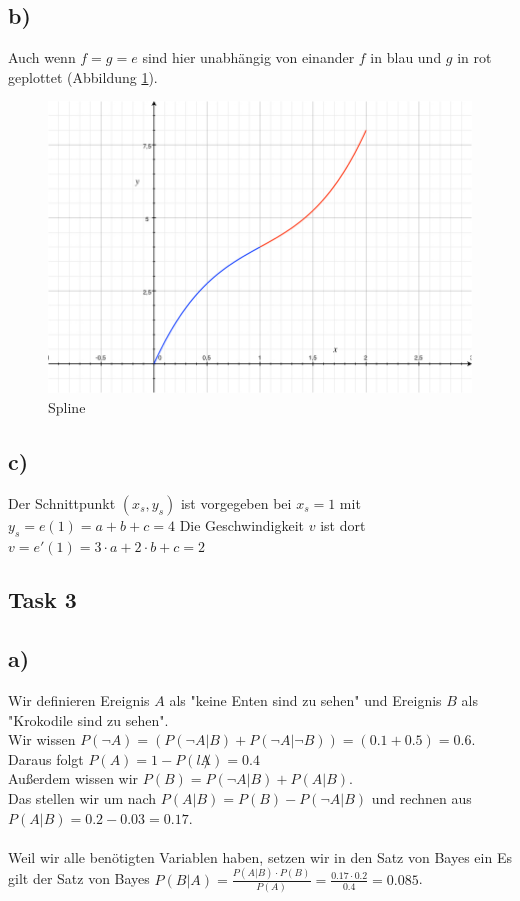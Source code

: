 \subsection{b)}
Auch wenn $f=g=e$ sind hier unabhängig von einander $f$ in blau und $g$ in rot geplottet (Abbildung \ref{fig1}).

\begin{figure}[!htpb]
\centering
\includegraphics[width=\linewidth]{img/capture_1-1.jpg}
\caption{Spline}
\label{fig1}
\end{figure}

\subsection{c)}

Der Schnittpunkt $(x_s,y_s)$ ist vorgegeben bei $x_s=1$ mit
$y_s=e(1)=a+b+c=4$
Die Geschwindigkeit $v$ ist dort
$v=e'(1)=3\cdot a+2\cdot b+c=2$


\subsection{Task 3}\label{ass12_t3}

\subsection{a)}

Wir definieren Ereignis $A$ als "keine Enten sind zu sehen" und Ereignis $B$ als "Krokodile sind zu sehen".\\
Wir wissen $P(\neg A) = (P(\neg A| B) + P(\neg A | \neg B)) = (0.1+0.5) = 0.6$.\\
Daraus folgt $P(A) = 1 - P(l\not A) = 0.4$\\
Außerdem wissen wir $P(B) = P(\neg A | B) + P(A | B)$.\\
Das stellen wir um nach $P(A|B) = P(B) - P(\neg A | B)$ und rechnen aus $P(A|B) = 0.2 - 0.03 = 0.17$.\\
\\
Weil wir alle benötigten Variablen haben, setzen wir in den Satz von Bayes ein
Es gilt der Satz von Bayes $P(B|A) = \frac{P(A|B) \cdot P(B)}{P(A)} = \frac{0.17 \cdot 0.2}{0.4} = 0.085$.

